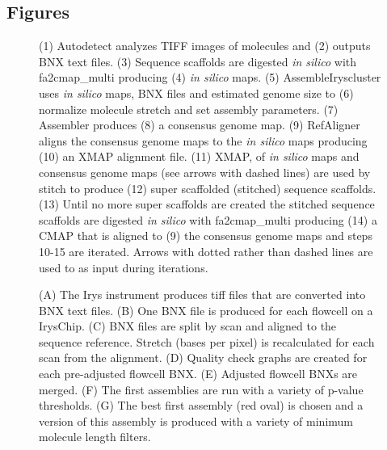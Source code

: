 \documentclass{bmcart}
\begin{document}
\begin{backmatter}

\section*{Figures}
  \begin{figure}[h!]
  	\caption{
  		(1) Autodetect analyzes TIFF images of molecules and (2) outputs BNX text files. (3) Sequence scaffolds are digested \textit{in silico} with fa2cmap\_multi producing (4) \textit{in silico} maps. (5) AssembleIryscluster uses \textit{in silico} maps, BNX files and estimated genome size to (6) normalize molecule stretch and set assembly parameters. (7) Assembler produces (8) a consensus genome map. (9) RefAligner aligns the consensus genome maps to the \textit{in silico} maps producing (10) an XMAP alignment file. (11) XMAP, of \textit{in silico} maps and consensus genome maps (see arrows with dashed lines) are used by stitch to produce (12) super scaffolded (stitched) sequence scaffolds. (13) Until no more super scaffolds are created the stitched sequence scaffolds are digested \textit{in silico} with fa2cmap\_multi producing (14) a CMAP that is aligned to (9) the consensus genome maps and steps 10-15 are iterated. Arrows with dotted rather than dashed lines are used to as input during iterations.}
  \end{figure}
  \begin{figure}[h!]
  	\caption{
  		(A) The Irys instrument produces tiff files that are converted into BNX text files. (B) One BNX file is produced for each flowcell on a IrysChip. (C) BNX files are split by scan and aligned to the sequence reference. Stretch (bases per pixel) is recalculated for each scan from the alignment. (D) Quality check graphs are created for each pre-adjusted flowcell BNX. (E) Adjusted flowcell BNXs are merged. (F) The first assemblies are run with a variety of p-value thresholds. (G) The best first assembly (red oval) is chosen and a version of this assembly is produced with a variety of minimum molecule length filters.}
  \end{figure}
  \begin{figure}[h!]
  \caption{
}
\end{figure}
\end{backmatter}
\end{document}
